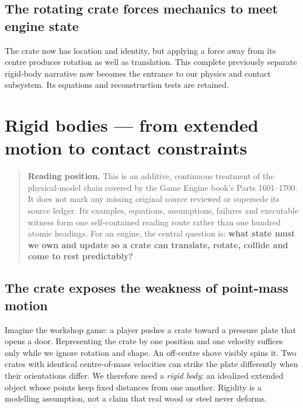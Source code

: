 \section{The rotating crate forces mechanics to meet engine state}\label{06-engine-ii-ch033-the-rotating-crate-forces-mechanics-to-meet-engine-state}

The crate now has location and identity, but applying a force away from its centre produces rotation as well as translation. This complete previously separate rigid-body narrative now becomes the entrance to our physics and contact subsystem. Its equations and reconstruction tests are retained.

\chapter{Rigid bodies --- from extended motion to contact constraints}\label{06-engine-ii-ch033-rigid-bodies-from-extended-motion-to-contact-constraints}

\begin{quote}
\textbf{Reading position.} This is an additive, continuous treatment of the physical-model chain covered by the Game Engine book's Parts 1601--1700. It does not mark any missing original source reviewed or supersede its source ledger. Its examples, equations, assumptions, failures and executable witness form one self-contained reading route rather than one hundred atomic headings. For an engine, the central question is: \textbf{what state must we own and update so a crate can translate, rotate, collide and come to rest predictably?}
\end{quote}

\section{The crate exposes the weakness of point-mass motion}\label{06-engine-ii-ch033-the-crate-exposes-the-weakness-of-point-mass-motion}

Imagine the workshop game: a player pushes a crate toward a pressure plate that opens a door. Representing the crate by one position and one velocity suffices only while we ignore rotation and shape. An off-centre shove visibly spins it. Two crates with identical centre-of-mass velocities can strike the plate differently when their orientations differ. We therefore need a \emph{rigid body}: an idealized extended object whose points keep fixed distances from one another. Rigidity is a modelling assumption, not a claim that real wood or steel never deforms.

